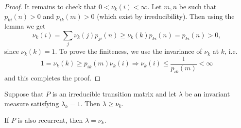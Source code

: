 \documentclass[a4paper]{article}
\begin{document}
\begin{proof}
    It remains to check that $0<\nu_k(i)<\infty$. Let $m, n$ be such that $p_{k i}(n)>0$ and $p_{i k}(m)>0$ (which exist by irreducibility). Then using the lemma we get
    \[
    \nu_k(i) = \sum _{j} \nu_k(j)p_{ji}(n) \geq \nu_k(k) p_{k i}(n)=p_{k i}(n)>0,
    \]
    since $\nu_k(k)=1$. To prove the finiteness, we use the invariance of $\nu_k$ at $k$, i.e.
    \[
    1=\nu_k(k) \geq p_{i k}(m) \nu_k(i) \Rightarrow \nu_k(i) \leq \frac{1}{p_{i k}(m)}<\infty
    \]
    and this completes the proof.
\end{proof}

\begin{theorem}\label{thm:8.9}
    Suppose that $P$ is an irreducible transition matrix and let $\lambda$ be an invariant measure satisfying $\lambda_k=1$. Then $\lambda \geq \nu_k$.

    If $P$ is also recurrent, then $\lambda=\nu_k$.
\end{theorem}
\end{document}
